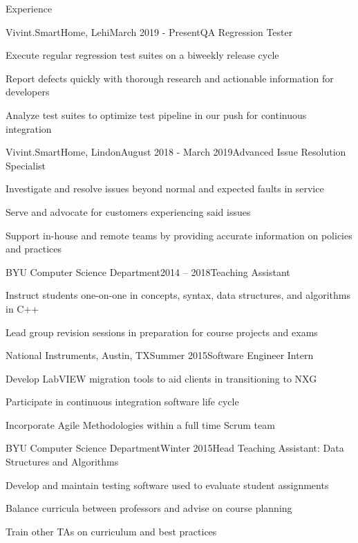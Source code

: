 \documentclass{resume} %
\begin{document}
\begin{rSection}{Experience}

\begin{rSubsection}{Vivint.SmartHome, Lehi}{March 2019 - Present}{QA Regression Tester}{}
  \item Execute regular regression test suites on a biweekly release cycle
  \item Report defects quickly with thorough research and actionable information for developers
  \item Analyze test suites to optimize test pipeline in our push for continuous integration
\end{rSubsection}

\begin{rSubsection}{Vivint.SmartHome, Lindon}{August 2018 - March 2019}{Advanced Issue Resolution Specialist}{}
  \item Investigate and resolve issues beyond normal and expected faults in service
  \item Serve and advocate for customers experiencing said issues
  \item Support in-house and remote teams by providing accurate information on policies and practices
\end{rSubsection}

\begin{rSubsection}{BYU Computer Science Department}{2014 – 2018}{Teaching Assistant}{}
  \item Instruct students one-on-one in concepts, syntax, data structures, and algorithms in C++
  \item Lead group revision sessions in preparation for course projects and exams
\end{rSubsection}

\begin{rSubsection}{National Instruments, Austin, TX}{Summer 2015}{Software Engineer Intern}{}
  \item Develop LabVIEW migration tools to aid clients in transitioning to NXG
  \item Participate in continuous integration software life cycle
  \item Incorporate Agile Methodologies within a full time Scrum team
\end{rSubsection}

\begin{rSubsection}{BYU Computer Science Department}{Winter 2015}{Head Teaching Assistant: Data Structures and Algorithms}{}
  \item Develop and maintain testing software used to evaluate student assignments
  \item Balance curricula between professors and advise on course planning
  \item Train other TAs on curriculum and best practices
\end{rSubsection}

\end{rSection}
\end{document}
